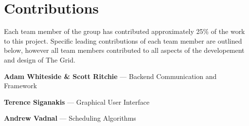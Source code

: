 \chapter{Contributions}
Each team member of the group has contributed approximately 25\% of the work to this project. Specific leading contributions of each team member are outlined below, however all team members contributed to all aspects of the developement and design of The Grid.

\textbf{Adam Whiteside \& Scott Ritchie} --- Backend Communication and Framework

\textbf{Terence Siganakis} --- Graphical User Interface

\textbf{Andrew Vadnal} --- Scheduling Algorithms
